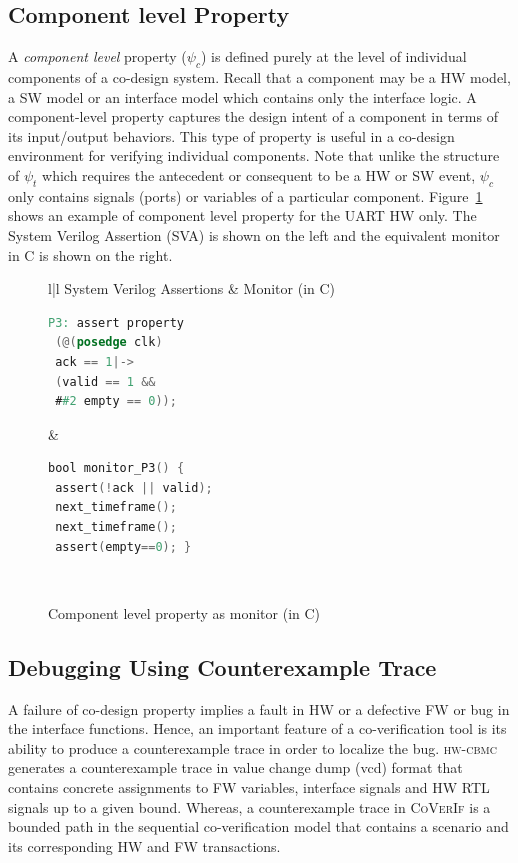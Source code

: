 \documentclass[sigconf]{acmart}
\newcommand{\tool}[1]{\textsc{#1}\xspace}
\newcommand{\hwcbmcv}{\tool{hw-cbmc}}
\newcommand{\verifox}{\tool{CoVerIf}}
\begin{document}
\subsection{Component level Property}
A {\em component level} property ($\psi_{c}$) is defined purely at the 
level of individual components of a co-design system. Recall that a component 
may be a HW model, a SW model or an interface model which contains only the 
interface logic.  A component-level property captures the design intent of a 
component in terms of its input/output behaviors.  This type of property 
is useful in a co-design environment for verifying individual components.   
Note that unlike the structure of $\psi_{t}$ which requires the antecedent 
or consequent to be a HW or SW event,  $\psi_{c}$ only contains signals 
(ports) or variables of a particular component.  Figure~\ref{figure:component} 
shows an example of component level property for the UART HW only.  The 
System Verilog Assertion (SVA) is shown on the left and the equivalent 
monitor in C is shown on the right.  
%
\begin{figure}[htbp]
\scriptsize
\begin{tabular}{l|l}
\hline
System Verilog Assertions  & Monitor (in C)
\\
\hline
\begin{lstlisting}[mathescape=true,language=Verilog]
P3: assert property 
 (@(posedge clk) 
 ack == 1|-> 
 (valid == 1 && 
 ##2 empty == 0)); 
\end{lstlisting}
&
\begin{lstlisting}[mathescape=true,language=C]
bool monitor_P3() {
 assert(!ack || valid);
 next_timeframe();
 next_timeframe();
 assert(empty==0); }
\end{lstlisting} \\
\hline
\end{tabular}
\caption{Component level property as monitor (in C)}
\label{figure:component}
\end{figure}
%
\subsection{Debugging Using Counterexample Trace}
A failure of co-design property implies a fault in HW or a defective FW 
or bug in the interface functions.  Hence, an important feature of a
co-verification tool is its ability to produce a counterexample trace 
in order to localize the bug.  \hwcbmcv generates a counterexample
trace in value change dump (vcd) format that contains concrete assignments to FW
variables, interface signals and HW RTL signals up to a given bound. Whereas, a
counterexample trace in \verifox is a bounded path in the sequential co-verification
model that contains a scenario and its corresponding HW and FW transactions. 
%
\end{document}
